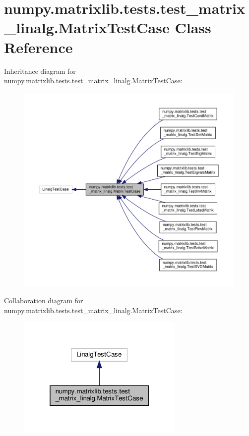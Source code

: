 \hypertarget{classnumpy_1_1matrixlib_1_1tests_1_1test__matrix__linalg_1_1MatrixTestCase}{}\section{numpy.\+matrixlib.\+tests.\+test\+\_\+matrix\+\_\+linalg.\+Matrix\+Test\+Case Class Reference}
\label{classnumpy_1_1matrixlib_1_1tests_1_1test__matrix__linalg_1_1MatrixTestCase}


Inheritance diagram for numpy.\+matrixlib.\+tests.\+test\+\_\+matrix\+\_\+linalg.\+Matrix\+Test\+Case\+:
\nopagebreak
\begin{figure}[H]
\begin{center}
\leavevmode
\includegraphics[width=350pt]{classnumpy_1_1matrixlib_1_1tests_1_1test__matrix__linalg_1_1MatrixTestCase__inherit__graph}
\end{center}
\end{figure}


Collaboration diagram for numpy.\+matrixlib.\+tests.\+test\+\_\+matrix\+\_\+linalg.\+Matrix\+Test\+Case\+:
\nopagebreak
\begin{figure}[H]
\begin{center}
\leavevmode
\includegraphics[width=229pt]{classnumpy_1_1matrixlib_1_1tests_1_1test__matrix__linalg_1_1MatrixTestCase__coll__graph}
\end{center}
\end{figure}
